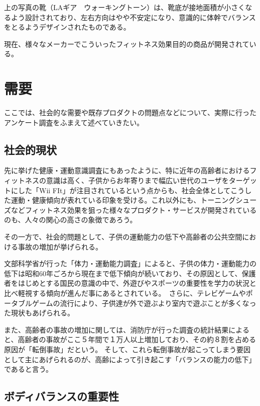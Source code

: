 上の写真の靴（LAギア　ウォーキングトーン）は、靴底が接地面積が小さくなるよう設計されており、左右方向はやや不安定になり、意識的に体幹でバランスをとるようデザインされたものである。 \cite{hoge05}

現在、様々なメーカーでこういったフィットネス効果目的の商品が開発されている。




\section{需要}

ここでは、社会的な需要や既存プロダクトの問題点などについて、実際に行ったアンケート調査をふまえて述べていきたい。

\subsection{社会的現状}

先に挙げた健康・運動意識調査にもあったように、特に近年の高齢者におけるフィットネスの意識は高く、子供からお年寄りまで幅広い世代のユーザをターゲットにした「Wii FIt」が注目されているという点からも、社会全体としてこうした運動・健康傾向が表れている印象を受ける。これ以外にも、トーニングシューズなどフィットネス効果を狙った様々なプロダクト・サービスが開発されているのも、人々の関心の高さの象徴であろう。

その一方で、社会的問題として、子供の運動能力の低下や高齢者の公共空間における事故の増加が挙げられる。

文部科学省が行った「体力・運動能力調査」によると、子供の体力・運動能力の低下は昭和60年ごろから現在まで低下傾向が続いており、その原因として、保護者をはじめとする国民の意識の中で、外遊びやスポーツの重要性を学力の状況と比べ軽視する傾向が進んだ事にあるとされている。\cite{hoge06}　さらに、テレビゲームやポータブルゲームの流行により、子供達が外で遊ぶより室内で遊ぶことが多くなった現状もあげられる。

また、高齢者の事故の増加に関しては、消防庁が行った調査の統計結果によると、高齢者の事故がここ５年間で１万人以上増加しており、その約８割を占める原因が「転倒事故」だという。 \cite{hoge07}そして、これら転倒事故が起こってしまう要因として主にあげられるのが、高齢によって引き起こす「バランスの能力の低下」であると言う。 \cite{hoge08}


\subsection{ボディバランスの重要性}

